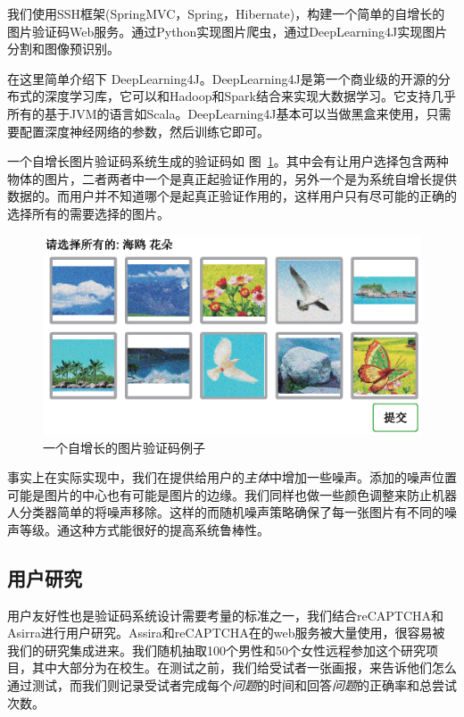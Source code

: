\documentclass[bachelor,zhspacing]{cqu}  %
\begin{document}
我们使用SSH框架(SpringMVC，Spring，Hibernate)，构建一个简单的自增长的图片验证码Web服务。通过Python实现图片爬虫，通过DeepLearning4J实现图片分割和图像预识别。

在这里简单介绍下
DeepLearning4J。DeepLearning4J是第一个商业级的开源的分布式的深度学习库，它可以和Hadoop和Spark结合来实现大数据学习。它支持几乎所有的基于JVM的语言如Scala。DeepLearning4J基本可以当做黑盒来使用，只需要配置深度神经网络的参数，然后训练它即可。

一个自增长图片验证码系统生成的验证码如
图~\ref{fig:captcha-demo}。其中会有让用户选择包含两种物体的图片，二者两者中一个是真正起验证作用的，另外一个是为系统自增长提供数据的。而用户并不知道哪个是起真正验证作用的，这样用户只有尽可能的正确的选择所有的需要选择的图片。

\begin{figure}[htbp]
\centering
\includegraphics{pic/captcha-demo.eps}
\caption{一个自增长的图片验证码例子}\label{fig:captcha-demo}
\end{figure}

事实上在实际实现中，我们在提供给用户的\emph{主体}中增加一些噪声。添加的噪声位置可能是图片的中心也有可能是图片的边缘。我们同样也做一些颜色调整来防止机器人分类器简单的将噪声移除。这样的而随机噪声策略确保了每一张图片有不同的噪声等级。通这种方式能很好的提高系统鲁棒性。

\subsection{用户研究}\label{ux7528ux6237ux7814ux7a76}

用户友好性也是验证码系统设计需要考量的标准之一，我们结合reCAPTCHA和Asirra进行用户研究。Assira和reCAPTCHA在的web服务被大量使用，很容易被我们的研究集成进来。我们随机抽取100个男性和50个女性远程参加这个研究项目，其中大部分为在校生。在测试之前，我们给受试者一张画报，来告诉他们怎么通过测试，而我们则记录受试者完成每个\emph{问题}的时间和回答\emph{问题}的正确率和总尝试次数。
\end{document}

